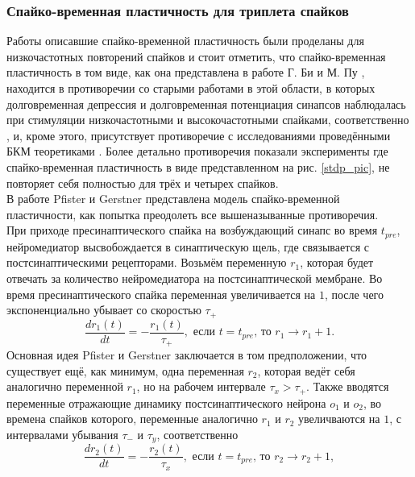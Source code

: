 \documentclass[a4paper,10pt]{article}
\begin{document}
\subsubsection{Спайко-временная пластичность для триплета спайков}
\indent Работы описавшие спайко-временной пластичность были проделаны для низкочастотных повторений спайков и стоит отметить, что спайко-временная пластичность в том виде, как она представлена в работе Г. Би и М. Пу \cite{stdp4}, находится в противоречии со старыми работами в этой области, в которых долговременная депрессия и долговременная потенциация синапсов наблюдалась при стимуляции низкочастотными и высокочастотными спайками, соответственно \cite{caporale2008spike}, и, кроме этого, присутствует противоречие с исследованиями проведёнными БКМ теоретиками \cite{Cooper}. Более детально противоречия показали эксперименты \cite{bi2002temporal,froemke2002spike,wang2005coactivation} где спайко-временная пластичность в виде представленном на рис. \ref{stdp_pic}, не повторяет себя полностью для трёх и четырех спайков.\\
\indent В работе Pfister и Gerstner \cite{PfisterTriple} представлена модель спайко-временной пластичности, как попытка преодолеть все вышеназыванные противоречия.\\
\indent При приходе пресинаптического спайка на возбуждающий синапс во время $t_{pre}$, нейромедиатор высвобождается в синаптическую щель, где связывается с постсинаптическими рецепторами. Возьмём переменную $r_{1}$, которая будет отвечать за количество нейромедиатора на постсинаптической мембране. Во время пресинаптического спайка переменная увеличивается на $1$, после чего экспоненциально убывает со скоростью $\tau_{+}$
\begin{equation}
\frac{dr_{1}(t)}{dt} = -\frac{r_{1}(t)}{\tau_{+}}, \mbox{ если } t=t_{pre}\mbox{, то }r_{1} \rightarrow r_{1} + 1.
\end{equation}
\indent Основная идея Pfister и Gerstner заключается в том предположении, что существует ещё, как минимум, одна переменная $r_{2}$, которая ведёт себя аналогично переменной $r_{1}$, но на рабочем интервале $\tau_{x}>\tau_{+}$. Также вводятся переменные отражающие динамику постсинаптического нейрона $o_{1}$ и $o_{2}$, во времена спайков которого, переменные аналогично $r_{1}$ и $r_{2}$ увеличваются на $1$, с интервалами убывания $\tau_{-}$ и $\tau_{y}$, соответственно
\begin{equation*}
\frac{dr_{2}(t)}{dt} = -\frac{r_{2}(t)}{\tau_{x}}, \mbox{ если } t=t_{pre}\mbox{, то }r_{2} \rightarrow r_{2} + 1,
\end{equation*}
\end{document}
